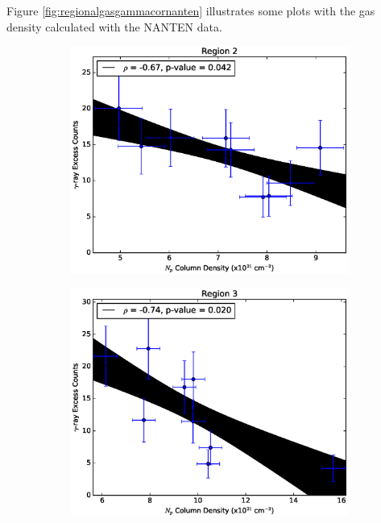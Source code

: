 \documentclass[12pt,a4paper]{article}
\begin{document}
\begin{appendices}
Figure \ref{fig:regionalgasgammacornanten} illustrates some plots with the gas density calculated with the NANTEN data.

\begin{figure}[H]
	\begin{subfigure}{0.5\textwidth}
		\centering
		\includegraphics[width=0.95\linewidth, height=0.27\textheight]{gamma_nHI_reg2}
		\label{fig:gnHIreg2}
	\end{subfigure}
	\begin{subfigure}{0.5\textwidth}
		\centering
		\includegraphics[width=0.9\linewidth, height=0.27\textheight]{gamma_nHI_reg3}
		\label{fig:gnHIreg3}
	\end{subfigure}
	\begin{subfigure}{0.5\textwidth}

\end{subfigure}
\end{figure}
\end{appendices}
\end{document}

